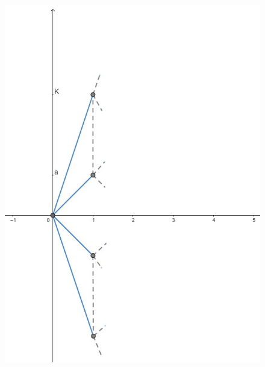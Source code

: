 \documentclass[12pt]{homework}
\begin{document}
\begin{enumerate}
\begin{figure}[htb]
\includegraphics[scale=0.45]{martingalaex7.jpg}
  \end{figure}
  

\end{enumerate}
\end{document}
